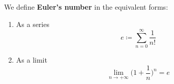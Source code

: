  \begin{definition}
    \label{def:eulers-number}
    We define \textbf{Euler's number} in the equivalent forms: 
    \begin{enumerate}
      \item As a series
        \begin{equation}
          e \coloneqq \sum_{n=0}^\infty \frac{1}{n!}
        \end{equation}

      \item As a limit
        \begin{equation}
          \lim_{n \rightarrow +\infty} \bigg( 1 + \frac{1}{n} \bigg)^n = e 
        \end{equation}
    \end{enumerate}
  \end{definition}
